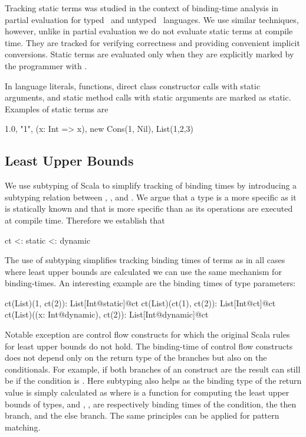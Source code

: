  Tracking static terms was studied in the context of binding-time analysis
  in partial evaluation for typed~\cite{nielson_1988_automatic} and
  untyped~\cite{gomard1991partial} languages. We use similar techniques, however,
  unlike in partial evaluation we do not evaluate static terms at compile time. They are tracked for verifying
  correctness and providing convenient implicit conversions. Static terms are evaluated only
  when they are explicitly marked by the programmer with .

In \tool language literals, functions, direct class constructor calls with static arguments, and static method
 calls with static arguments are marked as static. Examples of static terms are\begin{lstparagraph}
1.0, "1", (x: Int => x), new Cons(1, Nil), List(1,2,3)
\end{lstparagraph}

\subsection{Least Upper Bounds}
\label{sct:lub}

 We use subtyping of Scala to simplify tracking of binding times by introducing a
 subtyping relation between , , and . We argue that
 a  type is a more specific  as it is statically known
 and that  is more specific than  as its operations are executed
 at compile time. Therefore we establish that\begin{lstparagraph}
                 ct <: static <: dynamic
\end{lstparagraph}

 The use of subtyping simplifies tracking binding times of terms as in all cases
 where least upper bounds are calculated we can use the same mechanism for binding-times.
 An interesting example are the binding times of type parameters:\begin{lstparagraph}
ct(List)(1, ct(2)): List[Int@static]@ct
ct(List)(ct(1), ct(2)): List[Int@ct]@ct
ct(List)((x: Int@dynamic), ct(2)): List[Int@dynamic]@ct
\end{lstparagraph}

Notable exception are control flow constructs for which the original Scala rules for least
 upper bounds do not hold. The binding-time of control flow constructs does not
 depend only on the return type of the branches but also on the conditionals. For example, if
 both branches of an  construct are  the result can still be 
 if the condition is . Here subtyping also helps as the binding type of the
 return value is simply calculated as  where  is a function
 for computing the least upper bounds of types, and , ,  are respectively
 binding times of the condition, the then branch, and the else branch. The same principles can be applied for
 pattern matching.

